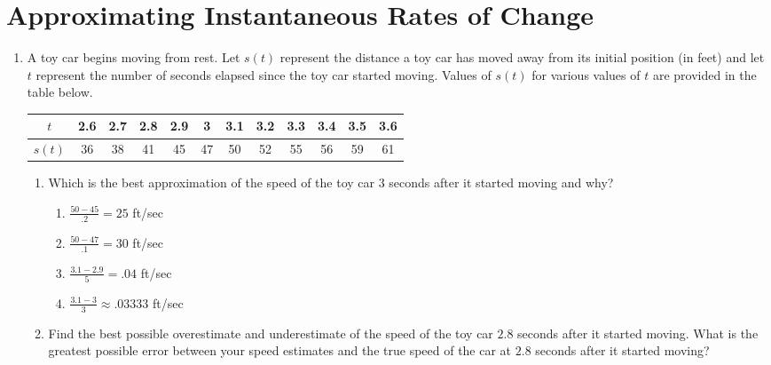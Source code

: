 \documentclass[12pt]{report}
\begin{document}
\newcommand{\less}{\textless}
\newcommand{\greater}{\textgreater}
\newcommand{\reals}{\mathbb{R}}
\newcommand{\integers}{\mathbb{Z}}
\newcommand{\rationals}{\mathbb{Q}}
\newcommand{\dsp}{\displaystyle}



\section*{Approximating Instantaneous Rates of Change}

\begin{enumerate}

\item A toy car begins moving from rest. Let $s(t)$ represent the distance a toy car has moved away from its initial position (in feet) and let $t$ represent the number of seconds elapsed since the toy car started moving. Values of $s(t)$ for various values of $t$ are provided in the table below.

\begin{center}
\begin{tabular}{|c|c|c|c|c|c|c|c|c|c|c|c|}\hline

$t$ &2.6 &2.7 &2.8 & 2.9&3 &3.1 &3.2 &3.3 &3.4 & 3.5&3.6\\ \hline
 $s(t)$ &36 &38 &41 & 45 &47 & 50 &52 & 55&56 & 59& 61\\ \hline

\end{tabular}
\end{center}

\begin{enumerate}

\item Which is the best approximation of the speed of the toy car $3$ seconds after it started moving and why?

\begin{enumerate}

\item $\frac{50-45}{.2}=25$ ft/sec 

\item  $\frac{50-47}{.1}=30$ ft/sec

\item $\frac{3.1-2.9}{5}=.04$ ft/sec

\item $\frac{3.1-3}{3}\approx .03333$ ft/sec

\end{enumerate} 

\item Find the best possible overestimate and underestimate of the speed of the toy car $2.8$ seconds after it started moving. What is the greatest possible error between your speed estimates and the true speed of the car at $2.8$ seconds after it started moving?


\end{enumerate}
\end{enumerate}
\end{document}
